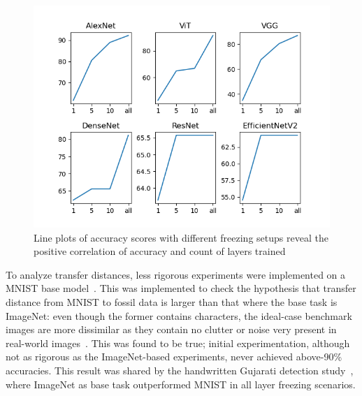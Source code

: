 \documentclass[english,twoside,openright]{UH_DS_MSc}
\begin{document}
\begin{figure}[h]
    \centering
    \includegraphics*[scale=0.8]{images/accuracy_against_freezing.png}
    \caption{Line plots of accuracy scores with different freezing setups reveal the positive correlation of accuracy and count of layers trained}
    \label{image:accuracy_vs_freezing}
\end{figure}

To analyze transfer distances, less rigorous experiments were implemented on a MNIST base model~\cite{jamilemnist}.
This was implemented to check the hypothesis that transfer distance from MNIST to fossil data is larger than that where 
the base task is ImageNet: even though the former contains characters, the ideal-case benchmark images are more dissimilar 
as they contain no clutter or noise very present in real-world images~\cite{alexnet}. This was found to be true; 
initial experimentation, although not as rigorous as the ImageNet-based experiments, never achieved above-90\% accuracies.
This result was shared by the handwritten Gujarati detection study~\cite{8goelGujarati2023}, where ImageNet as base task 
outperformed MNIST in all layer freezing scenarios. 
\end{document}
